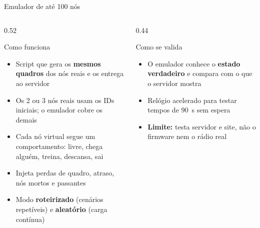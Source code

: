 \documentclass[aspectratio=169,11pt]{beamer}
\begin{document}
\begin{frame}[t]{Emulador de até 100 nós}
  \begin{columns}[T]
    \begin{column}{0.52\textwidth}
      \begin{block}{Como funciona}
        \footnotesize
        \begin{itemize}
          \item Script que gera os \textbf{mesmos quadros} dos nós reais e os entrega ao servidor
          \item Os 2 ou 3 nós reais usam os IDs iniciais; o emulador cobre os demais
          \item Cada nó virtual segue um comportamento: livre, chega alguém, treina, descansa, sai
          \item Injeta perdas de quadro, atraso, nós mortos e passantes
          \item Modo \textbf{roteirizado} (cenários repetíveis) e \textbf{aleatório} (carga contínua)
        \end{itemize}
      \end{block}
    \end{column}
    \begin{column}{0.44\textwidth}
      \begin{block}{Como se valida}
        \footnotesize
        \begin{itemize}
          \item O emulador conhece o \textbf{estado verdadeiro} e compara com o que o servidor mostra
          \item Relógio acelerado para testar tempos de 90~s sem espera
          \item \textbf{Limite:} testa servidor e site, não o firmware nem o rádio real
        \end{itemize}
      \end{block}
    \end{column}
  \end{columns}
\end{frame}
\end{document}
